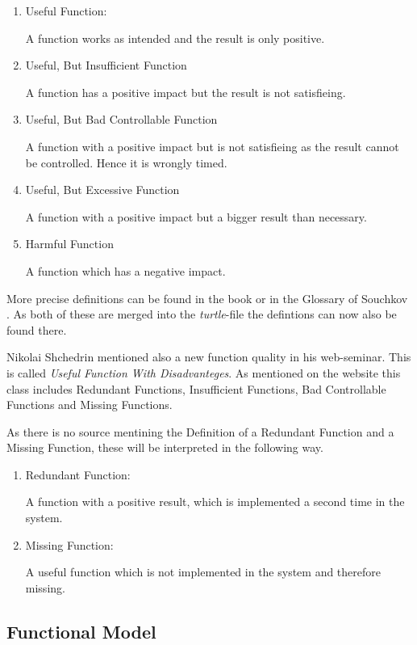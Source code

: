 \documentclass[11pt,a4paper]{article}
\begin{document}
\begin{enumerate}
\item Useful Function:
  
  A function works as intended and the result is only positive.
\item Useful, But Insufficient Function
  
  A function has a positive impact but the result is not satisfieing.
\item Useful, But Bad Controllable Function
  
  A function with a positive impact but is not satisfieing as the result
  cannot be controlled.  Hence it is wrongly timed.
\item Useful, But Excessive Function
  
  A function with a positive impact but a bigger result than necessary.
\item Harmful Function
  
  A function which has a negative impact.
\end{enumerate}

More precise definitions can be found in the book \cite{KS} or in the Glossary
of Souchkov \cite{SouchkovGlossary}.  As both of these are merged into the
\textit{turtle}-file the defintions can now also be found there.

Nikolai Shchedrin mentioned also a new function quality in his web-seminar.
This is called \textit{Useful Function With Disadvanteges}.  As mentioned on
the website \cite{ShchedrinUsefulFunctionDisadvantage} this class includes
Redundant Functions, Insufficient Functions, Bad Controllable Functions and
Missing Functions.

As there is no source mentining the Definition of a Redundant Function and a
Missing Function, these will be interpreted in the following way.

\begin{enumerate}
\item Redundant Function:
  
  A function with a positive result, which is implemented a second time in the
  system.
\item Missing Function:
  
  A useful function which is not implemented in the system and therefore
  missing.
\end{enumerate}

\subsection{Functional Model}
\label{subsec:functional_model}
\end{document}
